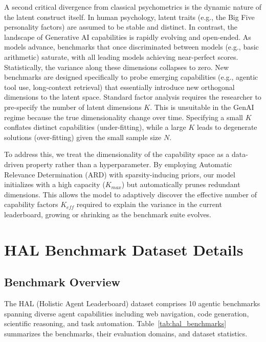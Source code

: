 \documentclass{article}
\theoremstyle{plain}
\theoremstyle{definition}
\theoremstyle{remark}
\begin{document}
A second critical divergence from classical psychometrics is the dynamic nature of the latent construct itself. In human psychology, latent traits (e.g., the Big Five personality factors) are assumed to be stable and distinct. In contrast, the landscape of Generative AI capabilities is rapidly evolving and open-ended. As models advance, benchmarks that once discriminated between models (e.g., basic arithmetic) saturate, with all leading models achieving near-perfect scores. Statistically, the variance along these dimensions collapses to zero. New benchmarks are designed specifically to probe emerging capabilities (e.g., agentic tool use, long-context retrieval) that essentially introduce new orthogonal dimensions to the latent space. Standard factor analysis requires the researcher to pre-specify the number of latent dimensions $K$. This is unsuitable in the GenAI regime because the true dimensionality change over time. Specifying a small $K$ conflates distinct capabilities (under-fitting), while a large $K$ leads to degenerate solutions (over-fitting) given the small sample size $N$.

To address this, we treat the dimensionality of the capability space as a data-driven property rather than a hyperparameter. By employing Automatic Relevance Determination (ARD) with sparsity-inducing priors, our model initializes with a high capacity ($K_{max}$) but automatically prunes redundant dimensions. This allows the model to adaptively discover the effective number of capability factors $K_{eff}$ required to explain the variance in the current leaderboard, growing or shrinking as the benchmark suite evolves.


\section{HAL Benchmark Dataset Details}
\label{sec:hal_details}

\subsection{Benchmark Overview}

The HAL (Holistic Agent Leaderboard) dataset comprises 10 agentic benchmarks spanning diverse agent capabilities including web navigation, code generation, scientific reasoning, and task automation. Table~\ref{tab:hal_benchmarks} summarizes the benchmarks, their evaluation domains, and dataset statistics.
\end{document}
